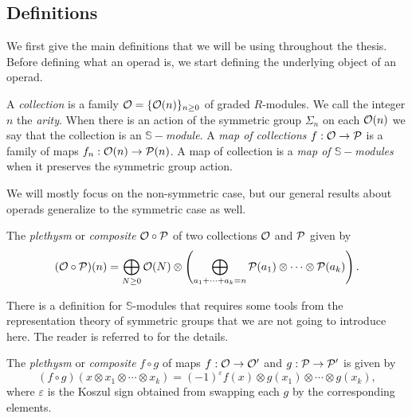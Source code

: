 \documentclass[Thesis.tex]{subfiles}
\begin{document}
\subsection{Definitions}
We first give the main definitions that we will be using throughout the thesis. Before defining what an operad is, we start defining the underlying object of an operad.

\begin{defin}\label{collections}
A \emph{collection} is a family ${\mathcal O}=\{{\mathcal O}(n)\}_{n\geq 0}$ of graded $R$-modules. We call the integer $n$ the \emph{arity}. When there is an action of the symmetric group $\Sigma_n$ on each ${\mathcal O}(n)$ we say that the collection is an \emph{$\mathbb{S}-$module}. A \emph{map of collections} $f:{\mathcal O}\to\mathcal{P}$ is a family of maps $f_n:{\mathcal O}(n)\to\mathcal{P}(n)$. A map of collection is a \emph{map of $\mathbb{S}-$modules} when it preserves the symmetric group action.
\end{defin}

We will mostly focus on the non-symmetric case, but our general results about operads generalize to the symmetric case as well. 

\begin{defin}
The \emph{plethysm} or \emph{composite} ${\mathcal O}\circ\mathcal{P}$ of two collections ${\mathcal O}$ and $\mathcal{P}$ given by
\[({\mathcal O}\circ\mathcal{P})(n)=\bigoplus_{N\geq 0}{\mathcal O}(N)\otimes \left(\bigoplus_{a_1+\cdots+a_k=n} \mathcal{P}(a_1)\otimes\cdots\otimes \mathcal{P}(a_k)\right).\]
\end{defin}
There is a definition for $\mathbb{S}$-modules that requires some tools from the representation theory of symmetric groups that we are not going to introduce here. The reader is referred to \cite{lodayvallette} for the details. 

\begin{defin}
The \emph{plethysm} or \emph{composite} $f\circ g$ of maps $f:{\mathcal O}\to{\mathcal O}'$ and $g:\mathcal{P}\to\mathcal{P}'$ is given by
\[(f\circ g)(x\otimes x_1\otimes\cdots\otimes x_k)=(-1)^{\varepsilon} f(x)\otimes g(x_1)\otimes\cdots\otimes g(x_k),\]
where $\varepsilon$ is the Koszul sign obtained from swapping each $g$ by the corresponding elements. 
\end{defin}

\end{document}
